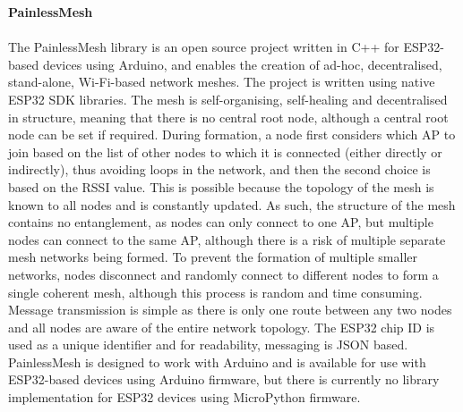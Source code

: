 \textbf{PainlessMesh}\\\\
The PainlessMesh library is an open source project written in C++ for ESP32-based devices using Arduino, and enables the creation of ad-hoc, decentralised, stand-alone, Wi-Fi-based network meshes. The project is written using native ESP32 SDK libraries. The mesh is self-organising, self-healing and decentralised in structure, meaning that there is no central root node, although a central root node can be set if required. During formation, a node first considers which AP to join based on the list of other nodes to which it is connected (either directly or indirectly), thus avoiding loops in the network, and then the second choice is based on the RSSI value. This is possible because the topology of the mesh is known to all nodes and is constantly updated. As such, the structure of the mesh contains no entanglement, as nodes can only connect to one AP, but multiple nodes can connect to the same AP, although there is a risk of multiple separate mesh networks being formed. To prevent the formation of multiple smaller networks, nodes disconnect and randomly connect to different nodes to form a single coherent mesh, although this process is random and time consuming. Message transmission is simple as there is only one route between any two nodes and all nodes are aware of the entire network topology. The ESP32 chip ID is used as a unique identifier and for readability, messaging is JSON based.
PainlessMesh is designed to work with Arduino and is available for use with ESP32-based devices using Arduino firmware, but there is currently no library implementation for ESP32 devices using MicroPython firmware. \citep{van_leeuwen_painlessmesh_2019}\\

